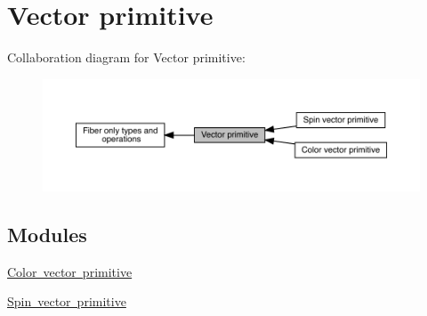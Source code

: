 \hypertarget{group__primvector}{}\section{Vector primitive}
\label{group__primvector}
Collaboration diagram for Vector primitive\+:\nopagebreak
\begin{figure}[H]
\begin{center}
\leavevmode
\includegraphics[width=350pt]{d3/dc4/group__primvector}
\end{center}
\end{figure}
\subsection*{Modules}
\begin{DoxyCompactItemize}
\item 
\mbox{\hyperlink{group__primcolorvector}{Color vector primitive}}
\item 
\mbox{\hyperlink{group__primspinvector}{Spin vector primitive}}
\end{DoxyCompactItemize}
